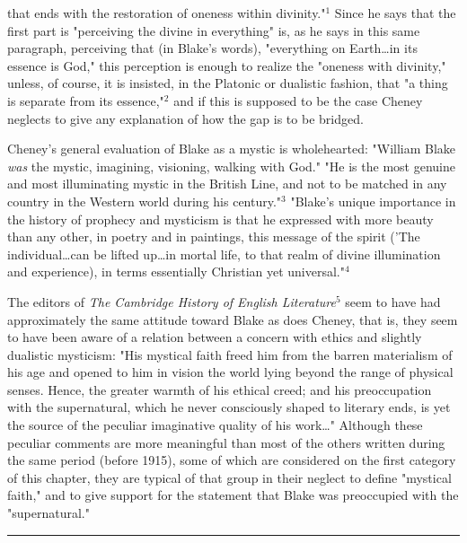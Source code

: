 \noindent that ends with the restoration of oneness within divinity."$^{1}$ Since he says that the
first part is "perceiving the divine in everything" is, as he says in this same paragraph, perceiving
that (in Blake's words), "everything on Earth\dots in its essence is God," this perception is enough to
realize the "oneness with divinity," unless, of course, it is insisted, in the Platonic or dualistic fashion, that
"a thing is separate from its essence,"$^{2}$ and if this is supposed to be the case Cheney neglects to give any explanation
of how the gap is to be bridged.\par
\vspace*{0.5\baselineskip}
Cheney's general evaluation of Blake as a mystic is wholehearted: "William Blake \textit{was} the mystic, imagining, visioning,
walking with God." "He is the most genuine and most illuminating mystic in the British Line, and not to be
matched in any country in the Western world during his century."$^{3}$ "Blake's unique  importance in the history of
prophecy and mysticism is that he expressed with more beauty than any other, in poetry and in paintings, this message of the spirit
('The individual\dots can be lifted up\dots in mortal life, to that realm of divine illumination and experience), in terms essentially
Christian yet universal."$^{4}$\par
\vspace*{0.5\baselineskip}
The editors of \textit{The Cambridge History of English Literature}$^{5}$ seem to have had approximately the same attitude toward
Blake as does Cheney, that is, they seem to have been aware of a relation between a concern with ethics and
slightly dualistic mysticism: "His mystical faith freed him from the barren materialism of his age and opened to him in
vision the world lying beyond the range of physical senses. Hence, the greater warmth of his ethical creed; and his
preoccupation with the supernatural, which he never consciously shaped to literary ends, is yet the source of the peculiar
imaginative quality of his work\dots" Although these peculiar comments are more meaningful than most of the others written
during the same period (before 1915), some of which are considered on the first category of this chapter, they are
typical of that group in their neglect to define "mystical faith," and to give support for the statement that Blake was
preoccupied with the "supernatural."\par
\vspace*{\fill}
\noindent\rule{0.25\textwidth}{0.4pt}\par
